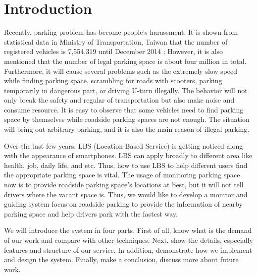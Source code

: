 \documentclass[journal,article,submit,moreauthors,pdftex,10pt,a4paper]{mdpi}
\begin{document}

\section{Introduction}\label{sec:intro}

Recently, parking problem has become people's harassment.
It is shown from statistical data in Ministry of
Transportation, Taiwan that the number of registered vehicles is
7,554,319 until December 2014 \cite{motc}; However, it is also mentioned that
the number of legal parking space is about four million in total.
Furthermore, it will cause several problems such as the extremely slow
speed while finding parking space, scrambling for roads with scooters,
parking temporarily in dangerous part, or driving U-turn illegally. The
behavior will not only break the safety and regular of transportation
but also make noise and consume resource.
It is easy to observe that some vehicles need to find parking space by
themselves while roadside parking spaces are not enough. The situation
will bring out arbitrary parking, and it is also the main reason of
illegal parking.

Over the last few years, LBS (Location-Based Service) \cite{LBS} is getting noticed along with
the appearance of smartphones. LBS can apply broadly to different area
like health, job, daily life, and etc. Thus, how to use LBS to help
different users find the appropriate parking space is vital. The usage
of monitoring parking space now is to provide roadside parking space's
locations at best, but it will not tell drivers where the vacant space
is. Thus, we would like to develop a monitor and guiding system focus on
roadside parking to provide the information of nearby parking space and
help drivers park with the fastest way.

We will introduce the system in four parts. First of all, know what is
the demand of our work and compare with other techniques. Next, show the
details, especially features and structure of our service. In addition,
demonstrate how we implement and design the system. Finally, make a
conclusion, discuss more about future work.


\end{document}
